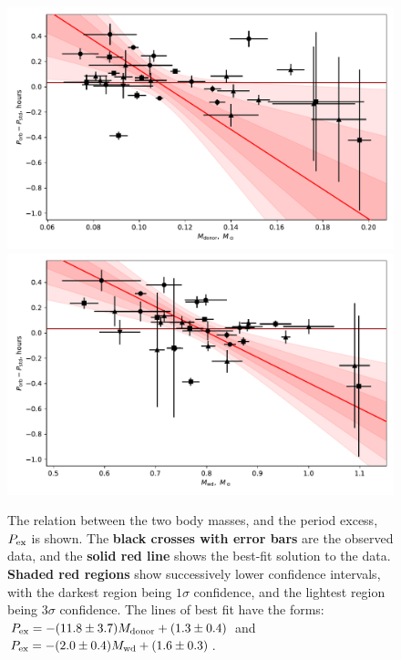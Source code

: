 \begin{figure}
    \centering
    \includegraphics[width=\columnwidth]{figures/results/Mdot/Period_excess_Mr.pdf}
    \includegraphics[width=\columnwidth]{figures/results/Mdot/Period_excess_Mwd.pdf}
    \caption{The relation between the two body masses, and the period excess, $P_{\rm ex}$ is shown. The {\bf black crosses with error bars} are the observed data, and the {\bf solid red line} shows the best-fit solution to the data. {\bf Shaded red regions} show successively lower confidence intervals, with the darkest region being $1\sigma$ confidence, and the lightest region being $3\sigma$ confidence. The lines of best fit have the forms: $P_{\rm ex} = -(11.8\pm3.7) M_{\rm donor} + (1.3\pm0.4)$ and $P_{\rm ex} = -(2.0\pm0.4) M_{\rm wd} + (1.6\pm0.3)$.}
    \label{fig:period excess}
\end{figure}
